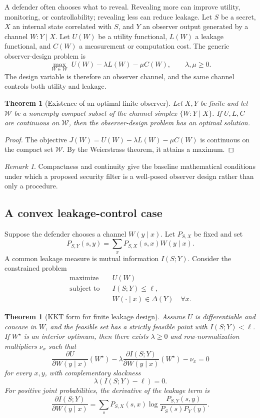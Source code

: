 \documentclass[11pt]{article}
\theoremstyle{definition}
\theoremstyle{plain}
\newtheorem{theorem}[definition]{Theorem}
\theoremstyle{remark}
\newtheorem{remark}[definition]{Remark}
\newcommand{\cW}{\mathcal{W}}
\newcommand{\DeltaS}{\Delta}
\begin{document}
A defender often chooses what to reveal. Revealing more can improve utility, monitoring, or controllability; revealing less can reduce leakage. Let $S$ be a secret, $X$ an internal state correlated with $S$, and $Y$ an observer output generated by a channel $W:Y\mid X$. Let $U(W)$ be a utility functional, $L(W)$ a leakage functional, and $C(W)$ a measurement or computation cost. The generic observer-design problem is
\[
    \max_{W\in\cW}\; U(W)-\lambda L(W)-\mu C(W),\qquad \lambda,\mu\ge 0.
\]
The design variable is therefore an observer channel, and the same channel controls both utility and leakage.

\begin{theorem}[Existence of an optimal finite observer]
Let $X,Y$ be finite and let $\cW$ be a nonempty compact subset of the channel simplex $\{W:Y\mid X\}$. If $U,L,C$ are continuous on $\cW$, then the observer-design problem has an optimal solution.
\end{theorem}

\begin{proof}
The objective $J(W)=U(W)-\lambda L(W)-\mu C(W)$ is continuous on the compact set $\cW$. By the Weierstrass theorem, it attains a maximum.
\end{proof}

\begin{remark}
Compactness and continuity give the baseline mathematical conditions under which a proposed security filter is a well-posed observer design rather than only a procedure.
\end{remark}

\subsection{A convex leakage-control case}

Suppose the defender chooses a channel $W(y\mid x)$. Let $P_{S,X}$ be fixed and set
\[
    P_{S,Y}(s,y)=\sum_x P_{S,X}(s,x)W(y\mid x).
\]
A common leakage measure is mutual information $I(S;Y)$. Consider the constrained problem
\[
\begin{aligned}
    \text{maximize}\quad & U(W)\\
    \text{subject to}\quad & I(S;Y)\le \ell,\\
    & W(\cdot\mid x)\in\DeltaS(Y)\quad\forall x.
\end{aligned}
\]

\begin{theorem}[KKT form for finite leakage design]
Assume $U$ is differentiable and concave in $W$, and the feasible set has a strictly feasible point with $I(S;Y)<\ell$. If $W^\star$ is an interior optimum, then there exists $\lambda\ge0$ and row-normalization multipliers $\nu_x$ such that
\[
    \frac{\partial U}{\partial W(y\mid x)}(W^\star)-\lambda\frac{\partial I(S;Y)}{\partial W(y\mid x)}(W^\star)-\nu_x=0
\]
for every $x,y$, with complementary slackness
\[
    \lambda(I(S;Y)-\ell)=0.
\]
For positive joint probabilities, the derivative of the leakage term is
\[
    \frac{\partial I(S;Y)}{\partial W(y\mid x)}
    =\sum_s P_{S,X}(s,x)\log\frac{P_{S,Y}(s,y)}{P_S(s)P_Y(y)}.
\]
\end{theorem}
\end{document}
